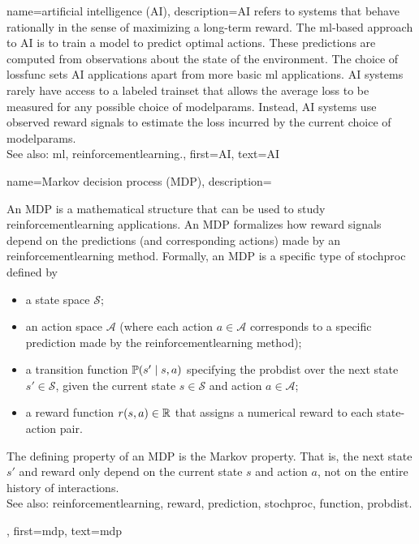 {name={artificial intelligence (AI)}, 
	description={AI refers to systems that behave rationally in the sense of 
		maximizing a long-term \gls{reward}. The \gls{ml}-based approach to AI is to train a \gls{model} to  
		predict optimal actions. These \glspl{prediction} are computed from observations about the state of the 
		environment. The choice of \gls{lossfunc} sets AI applications apart from more basic \gls{ml} applications. 
		AI systems rarely have access to a labeled \gls{trainset} that allows the average \gls{loss} to be 
		measured for any possible choice of \gls{modelparams}. Instead, AI systems use observed \gls{reward} 
		signals to estimate the \gls{loss} incurred by the current choice of \gls{modelparams}.
				\\
		See also: \gls{ml}, \gls{reinforcementlearning}.},
	first={AI},
	text={AI} 
}


{name={Markov decision process (MDP)},
	description={An MDP  is a mathematical structure that can 
    		be used to study \gls{reinforcementlearning} applications. An MDP formalizes how \gls{reward} 
		signals depend on the \glspl{prediction} (and corresponding actions) made by an \gls{reinforcementlearning} 
		method. Formally, an MDP is a specific type of \gls{stochproc} defined by
		\begin{itemize}
    			\item a state space $\mathcal{S}$;
    			\item an action space $\mathcal{A}$ (where each action $a \in \mathcal{A}$ corresponds to a specific 
			\gls{prediction} made by the \gls{reinforcementlearning} method);
    			\item a transition \gls{function} $\mathbb{P}({s' \mid s, a})$ specifying the \gls{probdist} over the 
			next state $s' \in \mathcal{S}$, given the current state $s \in \mathcal{S}$ and action $a \in \mathcal{A}$;
    			\item a \gls{reward} \gls{function} $r(s, a) \in \mathbb{R}$ that assigns a numerical \gls{reward} to each 
			state-action pair.
		\end{itemize}
		The defining property of an MDP is the Markov property. That is, the next state $s'$ and \gls{reward} 
		only depend on the current state $s$ and action $a$, not on the entire history of interactions. 
		\\
		See also: \gls{reinforcementlearning}, \gls{reward}, \gls{prediction}, \gls{stochproc}, \gls{function}, \gls{probdist}.},
 	first={mdp},
 	text={mdp} 
 }
 

